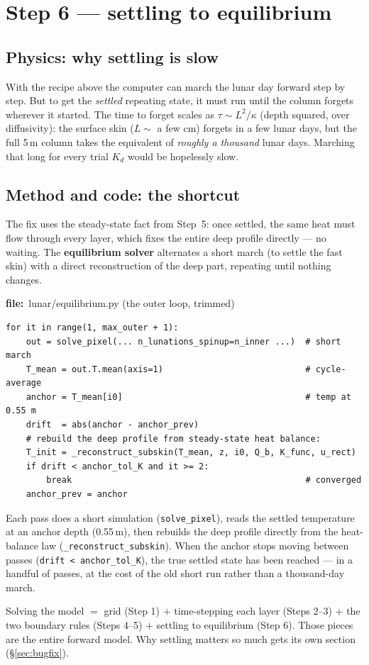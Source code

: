 \documentclass[11pt]{article}
\newcommand{\codefile}[1]{\par\smallskip\noindent
  {\footnotesize\ttfamily\color{teal!55!black}\textbf{file:}~#1}\par\nopagebreak}
\renewcommand{\codefile}[1]{\par\smallskip\noindent
    {\footnotesize\ttfamily\color{black}\textbf{file:}~#1}\par\nopagebreak}
\begin{document}
\section{Step 6 --- settling to equilibrium}\label{sec:equilibrium}
\subsection{Physics: why settling is slow}
With the recipe above the computer can march the lunar day forward step
by step. But to get the \emph{settled} repeating state, it must run until
the column forgets wherever it started. The time to forget scales as
$\tau\sim L^2/\kappa$ (depth squared, over diffusivity): the surface skin
($L\sim$ a few cm) forgets in a few lunar days, but the full 5\,m column
takes the equivalent of \emph{roughly a thousand} lunar days. Marching
that long for every trial $K_d$ would be hopelessly slow.

\subsection{Method and code: the shortcut}
The fix uses the steady-state fact from Step~5: once settled, the same
heat must flow through every layer, which fixes the entire deep profile
directly --- no waiting. The \textbf{equilibrium solver} alternates a
short march (to settle the fast skin) with a direct reconstruction of the
deep part, repeating until nothing changes.
\codefile{lunar/equilibrium.py (the outer loop, trimmed)}
\begin{lstlisting}
for it in range(1, max_outer + 1):
    out = solve_pixel(... n_lunations_spinup=n_inner ...)  # short march
    T_mean = out.T.mean(axis=1)                            # cycle-average
    anchor = T_mean[i0]                                    # temp at 0.55 m
    drift  = abs(anchor - anchor_prev)
    # rebuild the deep profile from steady-state heat balance:
    T_init = _reconstruct_subskin(T_mean, z, i0, Q_b, K_func, u_rect)
    if drift < anchor_tol_K and it >= 2:
        break                                              # converged
    anchor_prev = anchor
\end{lstlisting}
\begin{codebox}
Each pass does a short simulation (\texttt{solve\_pixel}), reads the
settled temperature at an anchor depth (0.55\,m), then rebuilds the deep
profile directly from the heat-balance law
(\texttt{\_reconstruct\_subskin}). When the anchor stops moving between
passes (\texttt{drift < anchor\_tol\_K}), the true settled state has been
reached --- in a handful of passes, at the cost of the old short run
rather than a thousand-day march.
\end{codebox}
\begin{keybox}
Solving the model $=$ grid (Step 1) $+$ time-stepping each layer
(Steps 2--3) $+$ the two boundary rules (Steps 4--5) $+$ settling to
equilibrium (Step 6). Those pieces are the entire forward model. Why
settling matters so much gets its own section (\S\ref{sec:bugfix}).
\end{keybox}
\end{document}
